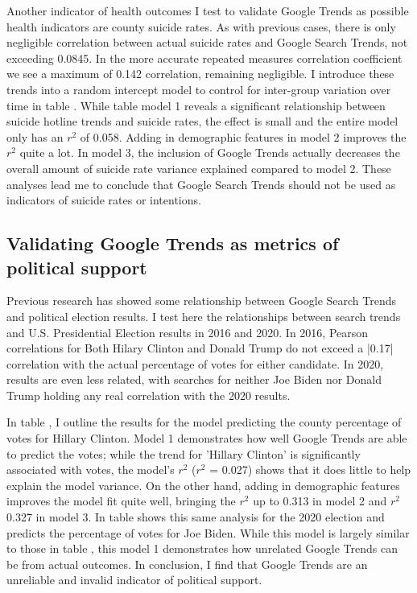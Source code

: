 Another indicator of health outcomes I test to validate Google Trends as
possible health indicators are county suicide rates. As with previous cases,
there is only negligible correlation between actual suicide rates and Google
Search Trends, not exceeding 0.0845. In the more accurate repeated measures
correlation coefficient we see a maximum of 0.142 correlation, remaining
negligible. I introduce these trends into a random intercept model to control
for inter-group variation over time in table 
. While
table 
model 1 reveals a significant relationship
between suicide hotline trends and suicide rates, the effect is small and the
entire model only has an $r^2$ of 0.058. Adding in demographic features in model
2 improves the $r^2$ quite a lot. In model 3, the inclusion of Google Trends
actually decreases the overall amount of suicide rate variance explained
compared to model 2. These analyses lead me to conclude that Google Search
Trends should not be used as indicators of suicide rates or intentions.

\subsection{Validating Google Trends as metrics of political support}

Previous research has showed some relationship between Google Search Trends and
political election results. I test here the relationships between search trends
and U.S. Presidential Election results in 2016 and 2020. In 2016, Pearson
correlations for Both Hilary Clinton and Donald Trump do not exceed a |0.17|
correlation with the actual percentage of votes for either candidate. In 2020,
results are even less related, with searches for neither Joe Biden nor Donald
Trump holding any real correlation with the 2020 results.

In table 
, I outline the results for the model
predicting the county percentage of votes for Hillary Clinton. Model 1
demonstrates how well Google Trends are able to predict the votes; while the
trend for 'Hillary Clinton' is significantly associated with votes, the model's
$r^2$ ($r^2$ = 0.027) shows that it does little to help explain the model
variance. On the other hand, adding in demographic features improves the model
fit quite well, bringing the $r^2$ up to 0.313 in model 2 and $r^2$ 0.327 in
model 3. In table 
shows this same analysis for the
2020 election and predicts the percentage of votes for Joe Biden. While this
model is largely similar to those in table 
, this
model 1 demonstrates how unrelated Google Trends can be from actual outcomes. In
conclusion, I find that Google Trends are an unreliable and invalid indicator of
political support.

